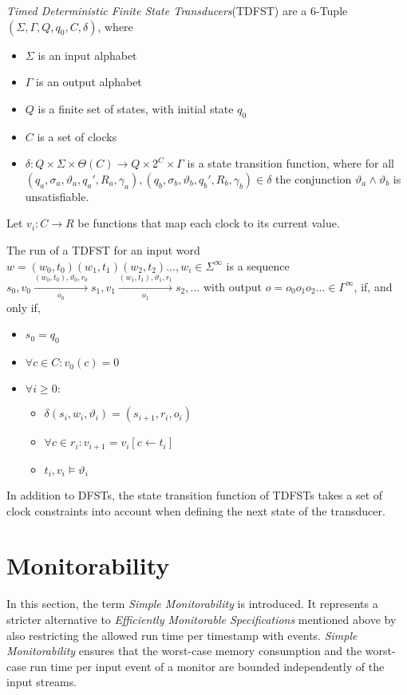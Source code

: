 		\begin{definition}
			\textit{Timed Deterministic Finite State Transducers}(TDFST) are a 6-Tuple $(\Sigma, \Gamma, Q, q_0, C, \delta)$, where
			\begin{itemize}
				\item
				$\Sigma$ is an input alphabet
				\item
				$\Gamma$ is an output alphabet
				\item
				$Q$ is a finite set of states, with initial state $q_0$
				\item
				$C$ is a set of clocks
				\item
				$\delta:Q\times\Sigma\times\Theta(C)\rightarrow Q\times 2^C\times\Gamma$ is a state transition function, where for all $(q_a, \sigma_a, \vartheta_a, q_a', R_a, \gamma_a), (q_b, \sigma_b, \vartheta_b, q_b', R_b, \gamma_b)\in \delta$ the conjunction $\vartheta_a\land\vartheta_b$ is unsatisfiable. 
			\end{itemize}
			Let $v_i:C\rightarrow R$ be functions that map each clock to its current value.
			
			The run of a TDFST for an input word $w=(w_0,t_0)(w_1,t_1)(w_2,t_2)..., w_i\in\Sigma^\infty$ is a sequence $s_0, v_0\xrightarrow[o_0]{(w_0, t_0),\vartheta_0,r_0}s_1,v_1\xrightarrow[o_1]{(w_1, t_1),\vartheta_1,r_1}s_2,...$ with output $o=o_0o_1o_2...\in \Gamma^\infty$, if, and only if, 
			\begin{itemize}
				\item
					$s_0=q_0$
				\item
					$\forall c\in C: v_0(c)=0$
				\item
					$\forall i\geq 0:$
					\begin{itemize}
						\item
							$\delta(s_i, w_i,\vartheta_i)=(s_{i+1},r_i,o_i)$
						\item
							$\forall c\in r_i: v_{i+1}=v_i[c\leftarrow t_i]$
						\item
							$t_i,v_i \models\vartheta_i$
					\end{itemize}
			\end{itemize}
		\end{definition}
		In addition to DFSTs, the state transition function of TDFSTs takes a set of clock constraints into account when defining the next state of the transducer.
	
\section{Monitorability}
	\label{sec:monitorability}
	In this section, the term \textit{Simple Monitorability} is introduced. It represents a stricter alternative to \textit{Efficiently Monitorable Specifications} mentioned above by also restricting the allowed run time per timestamp with events. \textit{Simple Monitorability} ensures that the worst-case memory consumption and the worst-case run time per input event of a monitor are bounded independently of the input streams. 
